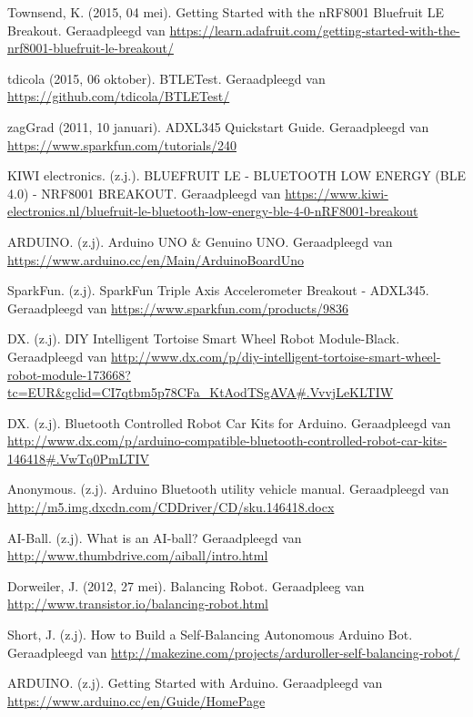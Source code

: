 \documentclass[12pt,a4paper]{article}
\begin{document}
\newpage
\begin{thebibliography}{9}
Townsend, K. (2015, 04 mei). Getting Started with the nRF8001 Bluefruit LE Breakout. 
Geraadpleegd van \url{https://learn.adafruit.com/getting-started-with-the-nrf8001-bluefruit-le-breakout/}

tdicola (2015, 06 oktober). BTLETest. Geraadpleegd van \url{https://github.com/tdicola/BTLETest/}

zagGrad (2011, 10 januari). ADXL345 Quickstart Guide. Geraadpleegd van \url{https://www.sparkfun.com/tutorials/240}

KIWI electronics. (z.j.). 
BLUEFRUIT LE - BLUETOOTH LOW ENERGY (BLE 4.0) - NRF8001 BREAKOUT. Geraadpleegd van \url{https://www.kiwi-electronics.nl/bluefruit-le-bluetooth-low-energy-ble-4-0-nRF8001-breakout}

ARDUINO. (z.j). Arduino UNO \& Genuino UNO. Geraadpleegd van \url{https://www.arduino.cc/en/Main/ArduinoBoardUno}

SparkFun. (z.j). SparkFun Triple Axis Accelerometer Breakout - ADXL345. Geraadpleegd van \url{https://www.sparkfun.com/products/9836}

DX. (z.j). DIY Intelligent Tortoise Smart Wheel Robot Module-Black. Geraadpleegd van 
\url{http://www.dx.com/p/diy-intelligent-tortoise-smart-wheel-robot-module-173668?tc=EUR&gclid=CI7qtbm5p78CFa_KtAodTSgAVA#.VvvjLeKLTIW}

DX. (z.j). Bluetooth Controlled Robot Car Kits for Arduino. Geraadpleegd van
\url{http://www.dx.com/p/arduino-compatible-bluetooth-controlled-robot-car-kits-146418#.VwTq0PmLTIV}

Anonymous. (z.j). Arduino Bluetooth utility vehicle manual. Geraadpleegd van
\url{http://m5.img.dxcdn.com/CDDriver/CD/sku.146418.docx}

AI-Ball. (z.j). What is an AI-ball? Geraadpleegd van
\url{http://www.thumbdrive.com/aiball/intro.html}

Dorweiler, J. (2012, 27 mei). Balancing Robot. Geraadpleeg van
\url{http://www.transistor.io/balancing-robot.html}

Short, J. (z.j). How to Build a Self-Balancing Autonomous Arduino Bot. Geraadpleegd van 
\url{http://makezine.com/projects/arduroller-self-balancing-robot/}

ARDUINO. (z.j). Getting Started with Arduino. Geraadpleegd van \url{https://www.arduino.cc/en/Guide/HomePage}
\end{thebibliography}
\end{document}
